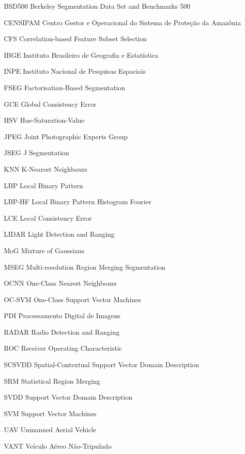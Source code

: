 \begin{siglas}
	\item[BSD500] Berkeley Segmentation Data Set and Benchmarks 500
	\item[CENSIPAM] Centro Gestor e Operacional do Sistema de Proteção da Amazônia
	\item[CFS] Correlation-based Feature Subset Selection
	\item[IBGE] Instituto Brasileiro de Geografia e Estatística
	\item[INPE] Instituto Nacional de Pesquisas Espaciais
	\item[FSEG] Factorisation-Based Segmentation
	\item[GCE] Global Consistency Error
	\item[HSV] Hue-Saturation-Value
	\item[JPEG] Joint Photographic Experts Group
	\item[JSEG] J Segmentation
	\item[KNN] K-Nearest Neighbours
	\item[LBP] Local Binary Pattern
	\item[LBP-HF] Local Binary Pattern Histogram Fourier
	\item[LCE] Local Consistency Error
	\item[LIDAR] Light Detection and Ranging
	\item[MoG] Mixture of Gaussians
	\item[MSEG] Multi-resolution Region Merging Segmentation
	\item[OCNN] One-Class Nearest Neighbours
	\item[OC-SVM] One-Class Support Vector Machines
	\item[PDI] Processamento Digital de Imagens
	\item[RADAR] Radio Detection and Ranging
	\item[ROC] Receiver Operating Characteristic
	\item[SCSVDD] Spatial-Contextual Support Vector Domain Description
	\item[SRM] Statistical Region Merging
	\item[SVDD] Support Vector Domain Description
	\item[SVM] Support Vector Machines
	\item[UAV] Unmanned Aerial Vehicle
	\item[VANT] Veículo Aéreo Não-Tripulado
\end{siglas}


